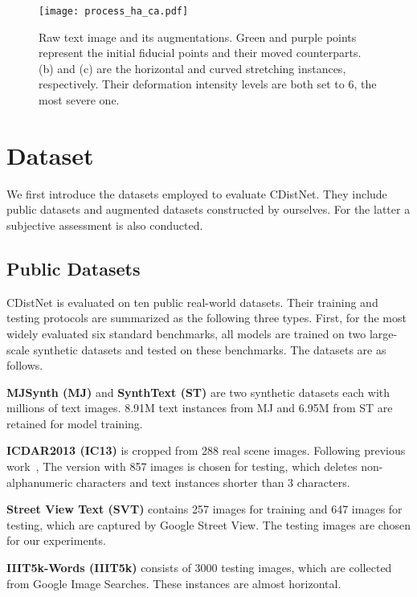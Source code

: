 \begin{figure*}[t]
\centering
\texttt{[image: process\_ha\_ca.pdf]} \caption{Raw text image and its augmentations. Green and purple points represent the initial fiducial points and their moved counterparts. (b) and (c) are the horizontal and curved stretching instances, respectively. Their deformation intensity levels are both set to 6, the most severe one. }
\label{fig:HA&CA_process}
\end{figure*}


\section{Dataset}

We first introduce the datasets employed to evaluate CDistNet. They include public datasets and augmented datasets constructed by ourselves. For the latter a subjective assessment is also conducted.  


\subsection{Public Datasets}
CDistNet is evaluated on ten public real-world datasets. Their training and testing protocols are summarized as the following three types. First, for the most widely evaluated six standard benchmarks, all models are trained on two large-scale synthetic datasets and tested on these benchmarks. The datasets are as follows.

\noindent\textbf{MJSynth (MJ)} \citep{MJor90K} and \textbf{SynthText (ST)} \citep{ST} are two synthetic datasets each with millions of text images. 8.91M text instances from MJ and 6.95M from ST are retained for model training. 

\noindent\textbf{ICDAR2013 (IC13)}
is cropped from 288 real scene images. Following previous work~\citep{Baekwhats_wrong_19ICCV}, The version with 857 images is chosen for testing, which deletes non-alphanumeric characters and text instances shorter than 3 characters. 

\noindent\textbf{Street View Text (SVT)} \citep{SVT} 
contains 257 images for training and 647 images for testing, which are captured by Google Street View. The testing images are chosen for our experiments.

\noindent\textbf{IIIT5k-Words (IIIT5k)} \citep{IIIT5K} 
consists of 3000 testing images, which are collected from Google Image Searches. These instances are almost horizontal.

